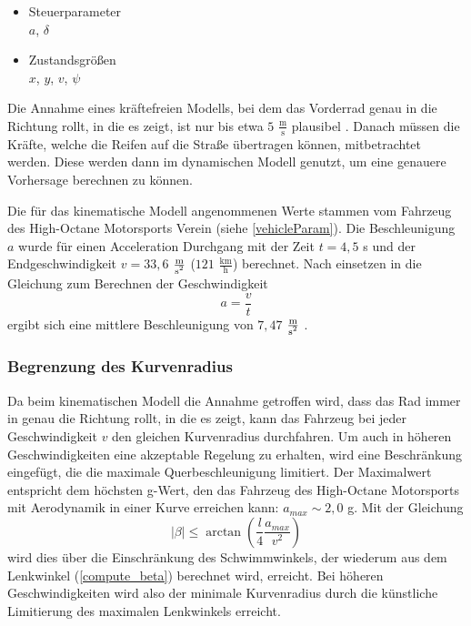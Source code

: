 \documentclass{like}
\begin{document}
\begin{itemize}
	\item Steuerparameter  \\
	\(a\), \(\delta\)
	\item Zustandsgrößen \\
	\(x\), \(y\), \(v\), \(\psi\)
	
\end{itemize}


Die Annahme eines kräftefreien Modells, bei dem das Vorderrad genau in die Richtung rollt, in die es zeigt, ist nur bis etwa $5$ $ \frac{\text{m}}{\text{s}}$ plausibel \cite{rajamani2011vehicle}. Danach müssen die Kräfte, welche die Reifen auf die Straße übertragen können, mitbetrachtet werden. Diese werden dann im dynamischen Modell genutzt, um eine genauere Vorhersage berechnen zu können.

Die für das kinematische Modell angenommenen Werte stammen vom Fahrzeug des High-Octane Motorsports Verein (siehe \ref{vehicleParam}). Die Beschleunigung \(a\) wurde für einen Acceleration Durchgang mit der Zeit $t = 4,5$ s und der Endgeschwindigkeit $v = 33,6$ $\frac{\text{m}}{\text{s\textsuperscript{2}}}$  ($121$  $\frac{\text{km}}{\text{h}}$) berechnet. Nach einsetzen in die Gleichung zum Berechnen der Geschwindigkeit 
\begin{equation}
a = \frac{v}{t}  \label{long_acc_kin}
\end{equation}
ergibt sich eine mittlere Beschleunigung von $7,47$ $ \frac{\text{m}}{\text{s\textsuperscript{2}}}$ .


\subsubsection*{Begrenzung des Kurvenradius}
\label{betaMax}
Da beim kinematischen Modell die Annahme getroffen wird, dass das Rad immer in genau die Richtung rollt, in die es zeigt, kann das Fahrzeug bei jeder Geschwindigkeit \(v\) den gleichen Kurvenradius durchfahren. Um auch in höheren Geschwindigkeiten eine akzeptable Regelung zu erhalten, wird eine Beschränkung eingefügt, die die maximale Querbeschleunigung limitiert. Der Maximalwert entspricht dem höchsten g-Wert, den das Fahrzeug des High-Octane Motorsports mit Aerodynamik in einer Kurve erreichen kann: $a_{max} \sim 2,0$ g. 
Mit der Gleichung
\begin{equation}
	|\beta| \leq \arctan \left(\frac{l}{4} \frac{a_{max}}{v^2} \right) \label{limitLatAcc}
\end{equation}
wird dies über die Einschränkung des Schwimmwinkels, der wiederum aus dem Lenkwinkel (\ref{compute_beta}) berechnet wird, erreicht. Bei höheren Geschwindigkeiten wird also der minimale Kurvenradius durch die künstliche Limitierung des maximalen Lenk\-win\-kels erreicht. 
\end{document}
